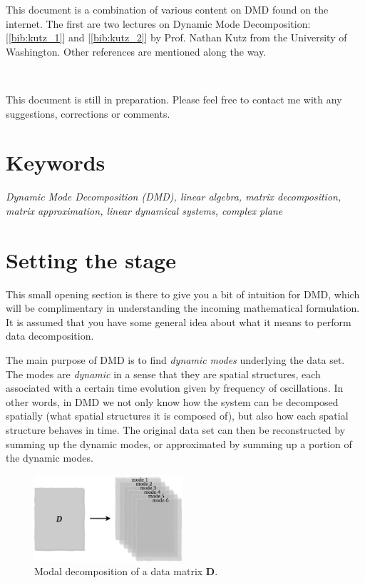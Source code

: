 \documentclass[10pt,twocolumn]{article}
\begin{document}
This document is a combination of various content on DMD found on the internet. The first are two lectures on Dynamic Mode Decomposition: [\ref{bib:kutz_1}] and [\ref{bib:kutz_2}] by Prof. Nathan Kutz from the University of Washington. Other references are mentioned along the way.

\,\,

This document is still in preparation. Please feel free to contact me with any suggestions, corrections or comments.

\section*{Keywords}

\textit{Dynamic Mode Decomposition (DMD), linear algebra, matrix decomposition, matrix approximation, linear dynamical systems, complex plane}



\tableofcontents


\section{Setting the stage}

This small opening section is there to give you a bit of intuition for DMD, which will be complimentary in understanding the incoming mathematical formulation. It is assumed that you have some general idea about what it means to perform data decomposition.

The main purpose of DMD is to find \textit{dynamic modes} underlying the data set. The modes are \textit{dynamic} in a sense that they are spatial structures, each associated with a certain time evolution given by frequency of oscillations. In other words, in DMD we not only know how the system can be decomposed spatially (what spatial structures it is composed of), but also how each spatial structure behaves in time. The original data set can then be reconstructed by summing up the dynamic modes, or approximated by summing up a portion of the dynamic modes. 

\begin{figure}[H]
\centering\includegraphics[width=5.5cm]{DMD-modal-decomposition.png}
\caption{Modal decomposition of a data matrix $\bm{D}$.}
\label{fig:modal-decomposition}
\end{figure}
\end{document}
